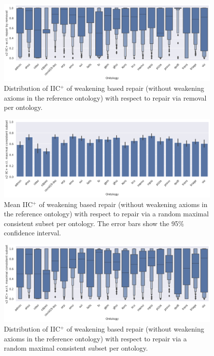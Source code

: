 \begin{figure}[ht]
  \centering
  \includegraphics[width=\textwidth]{resources/eiic-enhance-rem-ontology-violin.png}
  \caption{Distribution of IIC$^+$ of weakening based repair (without weakening axioms in the reference ontology) with respect to repair via removal per ontology.}
\end{figure}

\begin{figure}[ht]
  \centering
  \includegraphics[width=\textwidth]{resources/eiic-enhance-ontology-bar.png}
  \caption{Mean IIC$^+$ of weakening based repair (without weakening axioms in the reference ontology) with respect to repair via a random maximal consistent subset per ontology. The error bars show the 95\% confidence interval.}
\end{figure}

\begin{figure}[ht]
    \centering
    \includegraphics[width=\textwidth]{resources/eiic-enhance-ontology-violin.png}
    \caption{Distribution of IIC$^+$ of weakening based repair (without weakening axioms in the reference ontology) with respect to repair via a random maximal consistent subset per ontology.}
\end{figure}

